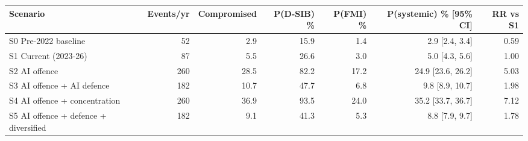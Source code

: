 \begin{tabular}{lrrrrrr}
\toprule
Scenario & Events/yr & Compromised & P(D-SIB) \% & P(FMI) \% & P(systemic) \% [95\% CI] & RR vs S1 \\
\midrule
S0 Pre-2022 baseline & 52 & 2.9 & 15.9 & 1.4 & 2.9 [2.4, 3.4] & 0.59 \\
S1 Current (2023-26) & 87 & 5.5 & 26.6 & 3.0 & 5.0 [4.3, 5.6] & 1.00 \\
S2 AI offence & 260 & 28.5 & 82.2 & 17.2 & 24.9 [23.6, 26.2] & 5.03 \\
S3 AI offence + AI defence & 182 & 10.7 & 47.7 & 6.8 & 9.8 [8.9, 10.7] & 1.98 \\
S4 AI offence + concentration & 260 & 36.9 & 93.5 & 24.0 & 35.2 [33.7, 36.7] & 7.12 \\
S5 AI offence + defence + diversified & 182 & 9.1 & 41.3 & 5.3 & 8.8 [7.9, 9.7] & 1.78 \\
\bottomrule
\end{tabular}